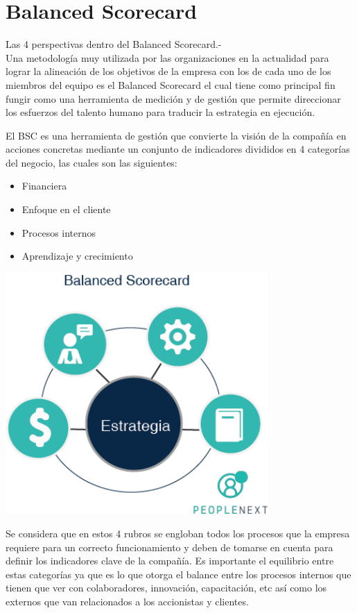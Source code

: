  \section{Balanced Scorecard} 

{\Large Las 4 perspectivas dentro del Balanced Scorecard.-}\\
Una metodología muy utilizada por las organizaciones en la actualidad para lograr la alineación de los objetivos de la empresa con los de cada uno de los miembros del equipo es el Balanced Scorecard el cual tiene como principal fin fungir como una herramienta de medición y de gestión que permite direccionar los esfuerzos del talento humano para traducir la estrategia en ejecución.


El BSC es una herramienta de gestión que convierte la visión de la compañía en acciones concretas mediante un conjunto de indicadores divididos en 4 categorías del negocio, las cuales son las siguientes:
 
\begin{itemize}
		\item Financiera
		\item Enfoque en el cliente
		\item Procesos internos
		\item Aprendizaje y crecimiento
\end{itemize}

\begin{center}
	\includegraphics[width=10cm]{./Imagenes/imagen1} 
\end{center}
Se considera que en estos 4 rubros se engloban todos los procesos que la empresa requiere para un correcto funcionamiento y deben de tomarse en cuenta para definir los indicadores clave de la compañía. Es importante el equilibrio entre estas categorías ya que es lo que otorga el balance entre los procesos internos que tienen que ver con colaboradores, innovación, capacitación, etc así como los externos que van relacionados a los accionistas y clientes.\\
\pagebreak

